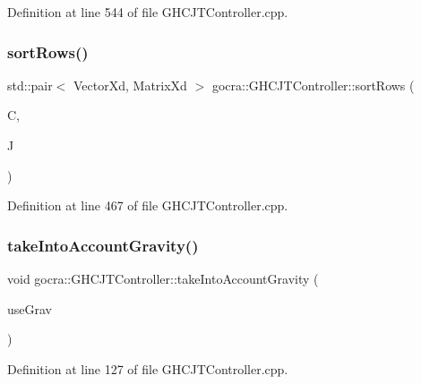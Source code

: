 Definition at line 544 of file G\+H\+C\+J\+T\+Controller.\+cpp.

\hypertarget{classgocra_1_1GHCJTController_a5ef80e1ba5c3b2d14352fe06ba7b20e4}{}\label{classgocra_1_1GHCJTController_a5ef80e1ba5c3b2d14352fe06ba7b20e4} 
\subsubsection{\texorpdfstring{sort\+Rows()}{sortRows()}}
{\footnotesize\ttfamily std\+::pair$<$ Vector\+Xd, Matrix\+Xd $>$ gocra\+::\+G\+H\+C\+J\+T\+Controller\+::sort\+Rows (\begin{DoxyParamCaption}\item[{const Eigen\+::\+Matrix\+Xd \&}]{C,  }\item[{const Eigen\+::\+Matrix\+Xd \&}]{J }\end{DoxyParamCaption})}



Definition at line 467 of file G\+H\+C\+J\+T\+Controller.\+cpp.

\hypertarget{classgocra_1_1GHCJTController_a755394cc7a6c038f517583faa47e7f62}{}\label{classgocra_1_1GHCJTController_a755394cc7a6c038f517583faa47e7f62} 
\subsubsection{\texorpdfstring{take\+Into\+Account\+Gravity()}{takeIntoAccountGravity()}}
{\footnotesize\ttfamily void gocra\+::\+G\+H\+C\+J\+T\+Controller\+::take\+Into\+Account\+Gravity (\begin{DoxyParamCaption}\item[{bool}]{use\+Grav }\end{DoxyParamCaption})}



Definition at line 127 of file G\+H\+C\+J\+T\+Controller.\+cpp.

\hypertarget{classgocra_1_1GHCJTController_a71c44a633f39e843d97fc7f97dddfce4}{}\label{classgocra_1_1GHCJTController_a71c44a633f39e843d97fc7f97dddfce4} 
